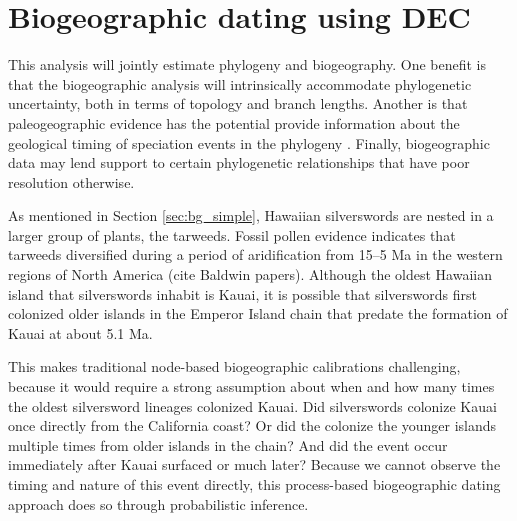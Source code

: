 

\section{Biogeographic dating using DEC} \label{sec:bg_phylo}

This analysis will jointly estimate phylogeny and biogeography.
One benefit is that the biogeographic analysis will intrinsically accommodate phylogenetic uncertainty, both in terms of topology and branch lengths.
Another is that paleogeographic evidence has the potential provide information about the geological timing of speciation events in the phylogeny \citep{landis16}.
Finally, biogeographic data may lend support to certain phylogenetic relationships that have poor resolution otherwise.

As mentioned in Section \ref{sec:bg_simple}, Hawaiian silverswords are nested in a larger group of plants, the tarweeds.
Fossil pollen evidence indicates that tarweeds diversified during a period of aridification from 15--5 Ma in the western regions of North America (cite Baldwin papers).
Although the oldest Hawaiian island that silverswords inhabit is Kauai, it is possible that silverswords first colonized older islands in the Emperor Island chain that predate the formation of Kauai at about 5.1 Ma.

This makes traditional node-based biogeographic calibrations challenging, because it would require a strong assumption about when and how many times the oldest silversword lineages colonized Kauai.
Did silverswords colonize Kauai once directly from the California coast? Or did the colonize the younger islands multiple times from older islands in the chain? And did the event occur immediately after Kauai surfaced or much later? Because we cannot observe the timing and nature of this event directly, this process-based biogeographic dating approach does so through probabilistic inference.

